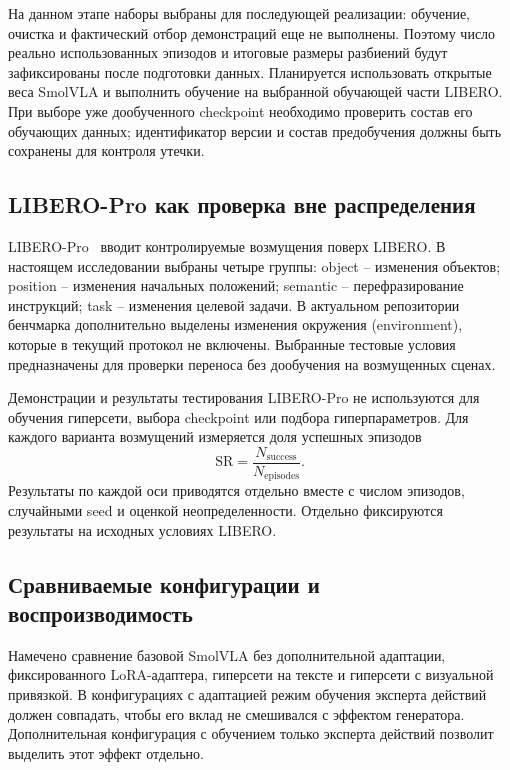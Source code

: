 \documentclass{misisarticle}
\begin{document}
На данном этапе наборы выбраны для последующей реализации: обучение, очистка и фактический отбор демонстраций еще не выполнены. Поэтому число реально использованных эпизодов и итоговые размеры разбиений будут зафиксированы после подготовки данных. Планируется использовать открытые веса SmolVLA и выполнить обучение на выбранной обучающей части LIBERO. При выборе уже дообученного checkpoint необходимо проверить состав его обучающих данных; идентификатор версии и состав предобучения должны быть сохранены для контроля утечки.

\subsection{LIBERO-Pro как проверка вне распределения}

LIBERO-Pro~\cite{liberopro} вводит контролируемые возмущения поверх LIBERO. В настоящем исследовании выбраны четыре группы: object -- изменения объектов; position -- изменения начальных положений; semantic -- перефразирование инструкций; task -- изменения целевой задачи. В актуальном репозитории бенчмарка дополнительно выделены изменения окружения (environment), которые в текущий протокол не включены. Выбранные тестовые условия предназначены для проверки переноса без дообучения на возмущенных сценах.

Демонстрации и результаты тестирования LIBERO-Pro не используются для обучения гиперсети, выбора checkpoint или подбора гиперпараметров. Для каждого варианта возмущений измеряется доля успешных эпизодов
\begin{equation}
  \mathrm{SR}=\frac{N_{\mathrm{success}}}{N_{\mathrm{episodes}}}.
\end{equation}
Результаты по каждой оси приводятся отдельно вместе с числом эпизодов, случайными seed и оценкой неопределенности. Отдельно фиксируются результаты на исходных условиях LIBERO.

\subsection{Сравниваемые конфигурации и воспроизводимость}

Намечено сравнение базовой SmolVLA без дополнительной адаптации, фиксированного LoRA-адаптера, гиперсети на тексте и гиперсети с визуальной привязкой. В конфигурациях с адаптацией режим обучения эксперта действий должен совпадать, чтобы его вклад не смешивался с эффектом генератора. Дополнительная конфигурация с обучением только эксперта действий позволит выделить этот эффект отдельно.
\end{document}
